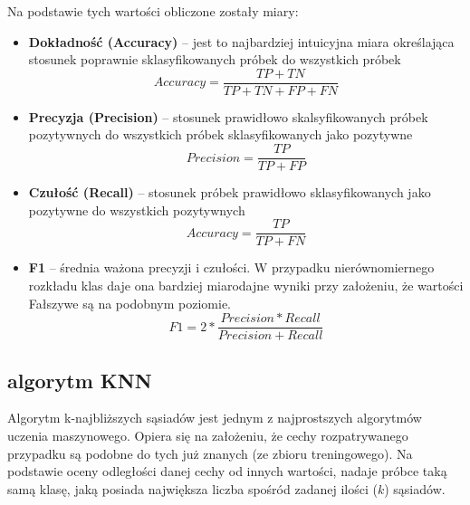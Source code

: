 \documentclass[12pt,a4paper]{article}
\begin{document}
        	Na podstawie tych wartości obliczone zostały miary:
        	\begin{itemize}
        	    \item \textbf{Dokładność (Accuracy)} -- jest to najbardziej intuicyjna miara określająca stosunek poprawnie sklasyfikowanych próbek do wszystkich próbek
        	        $$Accuracy=\frac{TP+TN}{TP+TN+FP+FN}$$
        	    
        	    \item \textbf{Precyzja (Precision)} -- stosunek prawidłowo skalsyfikowanych próbek pozytywnych do wszystkich próbek sklasyfikowanych jako pozytywne
        	        $$Precision=\frac{TP}{TP+FP}$$
        	   
        	    \item \textbf{Czułość (Recall)} -- stosunek próbek prawidłowo sklasyfikowanych jako pozytywne do wszystkich pozytywnych
        	        $$Accuracy=\frac{TP}{TP+FN}$$
        	    
        	    \item \textbf{F1} -- średnia ważona precyzji i czułości. W przypadku nierównomiernego rozkładu klas daje ona bardziej miarodajne wyniki przy założeniu, że wartości Fałszywe są na podobnym poziomie.
        	        $$F1=2*\frac{Precision * Recall}{Precision + Recall}$$
        	\end{itemize}
    	
        \subsection{algorytm KNN}
	        Algorytm k-najbliższych sąsiadów jest jednym z najprostszych algorytmów uczenia maszynowego. Opiera się na założeniu, że cechy rozpatrywanego przypadku są podobne do tych już znanych (ze zbioru treningowego). Na podstawie oceny odległości danej cechy od innych wartości, nadaje próbce taką samą klasę, jaką posiada największa liczba spośród zadanej ilości ($k$) sąsiadów.
	        
\end{document}

